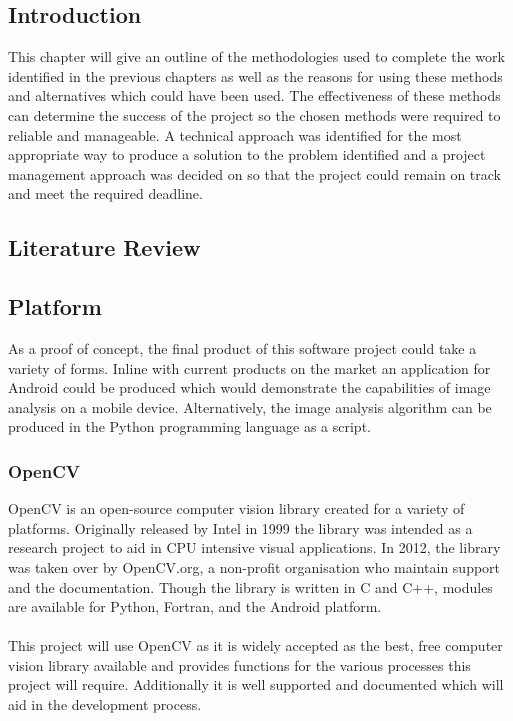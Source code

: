 \subsection{Introduction}
	This chapter will give an outline of the methodologies used to complete the work identified in the previous chapters as well as the reasons for using these methods and alternatives which could have been used. The effectiveness of these methods can determine the success of the project so the chosen methods were required to reliable and manageable. A technical approach was identified for the most appropriate way to produce a solution to the problem identified and a project management approach was decided on so that the project could remain on track and meet the required deadline.
\subsection{Literature Review}
\subsection{Platform}
	As a proof of concept, the final product of this software project could take a variety of forms. Inline with current products on the market an application for Android could be produced which would demonstrate the capabilities of image analysis on a mobile device. Alternatively, the image analysis algorithm can be produced in the Python programming language as a script.
	\subsubsection{OpenCV}
		OpenCV is an open-source computer vision library created for a variety of platforms. Originally released by Intel in 1999 the library was intended as a research project to aid in CPU intensive visual applications. In 2012, the library was taken over by OpenCV.org, a non-profit organisation who maintain support and the documentation. Though the library is written in C and C++, modules are available for Python, Fortran, and the Android platform.
		\\\\
		This project will use OpenCV as it is widely accepted as the best, free computer vision library available and provides functions for the various processes this project will require. Additionally it is well supported and documented which will aid in the development process.
